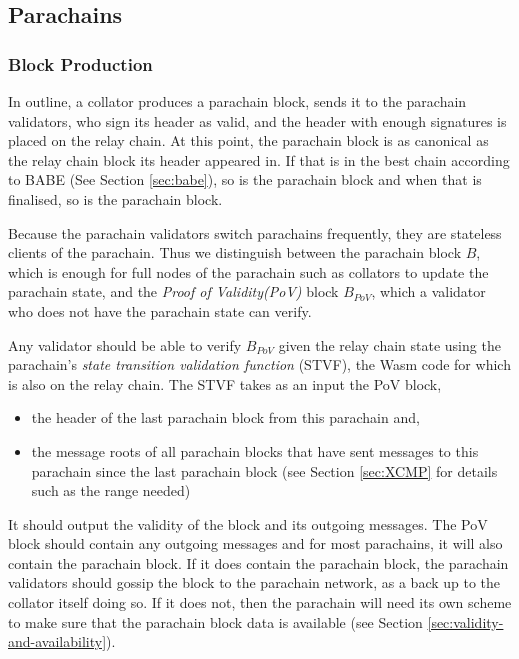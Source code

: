 \subsection{Parachains}\label{sec:parachains}

\subsubsection{Block Production}\label{sec:parachainblockproduction}
In outline, a collator produces a parachain block, sends it to the parachain validators,
who sign its header as valid, and the header with enough signatures is placed on the relay chain.
At this point, the parachain block is as canonical as the relay chain block its header appeared in.
If that is in the best chain according to BABE (See Section \ref{sec:babe}), so is the parachain block and when that is finalised, so is the parachain block.

Because the parachain validators switch parachains frequently, they are stateless clients of the parachain.
Thus we distinguish between the parachain block $B$, which is enough for full nodes of the parachain such as collators to update the parachain state,
and the {\em Proof of Validity(PoV)} block $B_{PoV}$, which a validator who does not have the parachain state can verify.

Any validator should be able to verify $B_{PoV}$ given the relay chain state using the parachain's {\em state transition validation function} (STVF),
the Wasm code for which is also on the relay chain.
The STVF takes as an input the PoV block,
\begin{itemize}
	\item  the header of the last parachain block from this parachain and,
	\item the message roots of all parachain blocks that have sent messages to this parachain since the last parachain block
	(see Section \ref{sec:XCMP} for details such as the range needed)
\end{itemize}
It should output the validity of the block and its outgoing messages.
The PoV block should contain any outgoing messages and for most parachains, it will also contain the parachain block.
If it does contain the parachain block, the parachain validators should gossip the block to the parachain network, as a back up to the collator itself doing so.
If it does not, then the parachain will need its own scheme to make sure that the parachain block data is available (see Section \ref{sec:validity-and-availability}).


